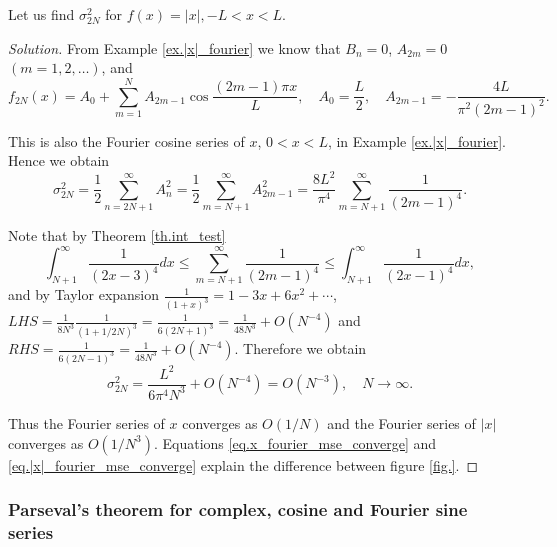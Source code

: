 \begin{example}[]
Let us find $\sigma_{2 N}^2$ for $f(x)=|x|,-L<x<L$.
\end{example}
\begin{proof}[Solution]
From Example \ref{ex.|x|_fourier} we know that $B_n=0$, $A_{2 m}=0$ $(m=1,2, \ldots)$, and
$$
f_{2 N}(x)=A_0+\sum_{m=1}^N A_{2 m-1} \cos \frac{(2 m-1) \pi x}{L}, \quad A_0=\frac{L}{2}, \quad A_{2 m-1}=-\frac{4 L}{\pi^2(2 m-1)^2} .
$$

This is also the Fourier cosine series of $x$, $0<x<L$, in Example \ref{ex.|x|_fourier}. Hence we obtain
$$
\sigma_{2 N}^2=\frac{1}{2} \sum_{n=2 N+1}^{\infty} A_n^2=\frac{1}{2} \sum_{m=N+1}^{\infty} A_{2 m-1}^2=\frac{8 L^2}{\pi^4} \sum_{m=N+1}^{\infty} \frac{1}{(2 m-1)^4} .
$$

Note that by Theorem \ref{th.int_test}
$$
\int_{N+1}^{\infty} \frac{1}{(2 x-3)^4} d x \leq \sum_{m=N+1}^{\infty} \frac{1}{(2 m-1)^4} \leq \int_{N+1}^{\infty} \frac{1}{(2 x-1)^4} d x,
$$
and by Taylor expansion $\frac{1}{(1+x)^3} = 1 - 3x + 6x^2 + \cdots$, $\textit{LHS} = \frac{1}{8N^3}\frac{1}{(1+1/2N)^3}=\frac{1}{6(2 N+1)^3}=\frac{1}{48 N^3}+O\left(N^{-4}\right)$ and $\textit{RHS}=\frac{1}{6(2 N-1)^3}=\frac{1}{48 N^3}+O\left(N^{-4}\right)$.
Therefore we obtain
\begin{equation}\label{eq.|x|_fourier_mse_converge}
    \sigma_{2 N}^2=\frac{L^2}{6 \pi^4 N^3}+O\left(N^{-4}\right)=O\left(N^{-3}\right), \quad N \rightarrow \infty .
\end{equation}

Thus the Fourier series of $x$ converges as $O(1 / N)$ and the Fourier series of $|x|$ converges as $O\left(1 / N^3\right)$. Equations \eqref{eq.x_fourier_mse_converge} and \eqref{eq.|x|_fourier_mse_converge} explain the difference between figure \ref{fig.}.
\end{proof}

\subsubsection{Parseval's theorem for complex, cosine and Fourier sine series}


